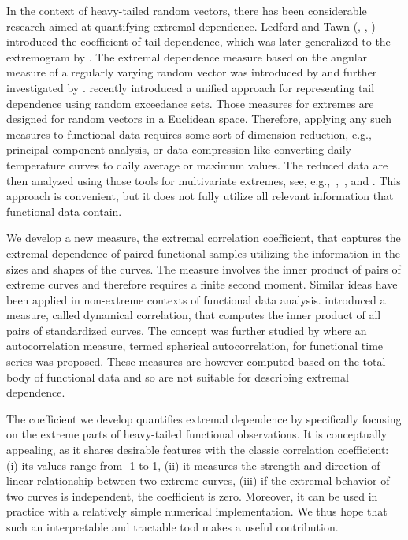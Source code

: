 \documentclass[lineno]{biometrika}
\begin{document}
In the context of heavy-tailed random vectors, there has been considerable research aimed at quantifying extremal dependence. Ledford and Tawn (\citeyear{ledford:tawn:1996}, \citeyear{ledford:tawn:1997},
\citeyear{ledford:tawn:2003}) introduced the coefficient of tail dependence, which was later generalized to the extremogram by
\citet{davis:mikosch:2009}. The extremal dependence measure based on the angular measure of a regularly varying random vector was introduced by \citet{resnick:2004} and further investigated by
\citet{larsson:resnick:2012}. \citet{janssen:neblung:stoev:2023} recently introduced a unified approach for representing tail dependence using random exceedance sets. Those measures for extremes are  designed for random vectors in a Euclidean space. Therefore, applying any such measures to functional data requires some sort of dimension reduction, e.g., principal component analysis, or data compression like converting daily temperature curves to daily average or maximum values. The reduced data are then analyzed using those tools for multivariate extremes, see, e.g.,~\citet{meinguet:2010},~\citet{dombry:ribatet:2015}, and \citet{kim:kokoszka:2023b}. This approach is convenient, but it does not fully utilize all relevant information that functional data contain.


We develop a new measure, the extremal correlation coefficient, that captures the extremal dependence of paired functional samples utilizing the information in the sizes and shapes of the curves. The measure involves the inner product of pairs of extreme curves and therefore
 requires a finite second moment.   Similar ideas have been applied in non-extreme contexts of functional data analysis. \citet{dubin:muller:2005} introduced a measure, called  dynamical correlation, that computes the inner product of all pairs of standardized curves. The concept was further studied by
\citet{yeh:rice:dubin:2023} where an  autocorrelation measure, termed spherical autocorrelation, for functional time series was proposed. These measures are however computed based on the total body of functional data and so are not suitable for describing extremal dependence.


The coefficient we develop quantifies extremal dependence by specifically focusing on the extreme parts of heavy-tailed functional observations. It is conceptually appealing, as it shares desirable features with the classic correlation coefficient: (i) its values range from -1 to 1, (ii) it measures the strength and direction of linear relationship between two extreme curves, (iii) if the extremal behavior of two curves is independent, the coefficient is zero. Moreover, it can be used in practice with a relatively simple numerical implementation. We thus hope that such an interpretable and tractable tool makes a useful contribution.
\end{document}
